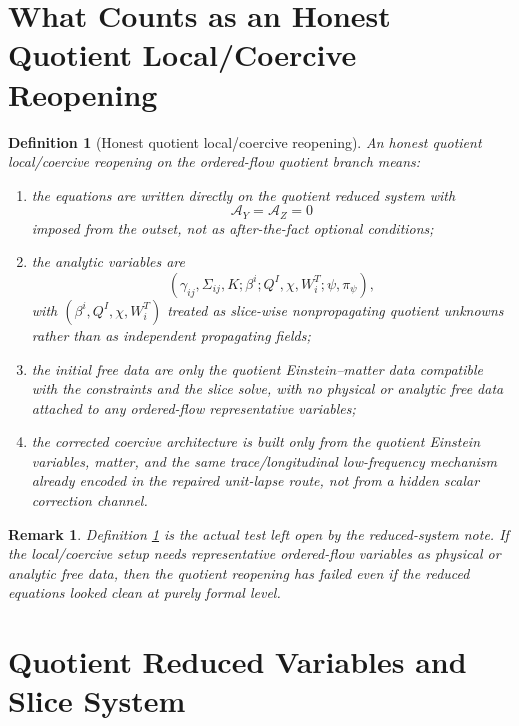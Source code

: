 \documentclass[11pt]{article}
\newtheorem{definition}{Definition}
\newtheorem{remark}{Remark}
\begin{document}
\section{What Counts as an Honest Quotient Local/Coercive Reopening}

\begin{definition}[Honest quotient local/coercive reopening]
\label{def:honest}
An \emph{honest quotient local/coercive reopening} on the ordered-flow quotient branch means:
\begin{enumerate}
    \item the equations are written directly on the quotient reduced system with
    \[
    \mathcal A_Y=\mathcal A_Z=0
    \]
    imposed from the outset, not as after-the-fact optional conditions;
    \item the analytic variables are
    \[
    (\gamma_{ij},\Sigma_{ij},K;\beta^i;Q^I,\chi,W_i^T;\psi,\pi_\psi),
    \]
    with \((\beta^i,Q^I,\chi,W_i^T)\) treated as slice-wise nonpropagating quotient unknowns rather than as independent propagating fields;
    \item the initial free data are only the quotient Einstein--matter data compatible with the constraints and the slice solve, with no physical or analytic free data attached to any ordered-flow representative variables;
    \item the corrected coercive architecture is built only from the quotient Einstein variables, matter, and the same trace/longitudinal low-frequency mechanism already encoded in the repaired unit-lapse route, not from a hidden scalar correction channel.
\end{enumerate}
\end{definition}

\begin{remark}
Definition \ref{def:honest} is the actual test left open by the reduced-system note. If the local/coercive setup needs representative ordered-flow variables as physical or analytic free data, then the quotient reopening has failed even if the reduced equations looked clean at purely formal level.
\end{remark}

\section{Quotient Reduced Variables and Slice System}
\end{document}

